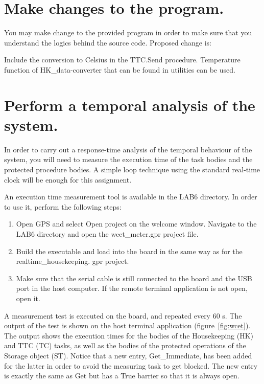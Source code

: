 \section{Make changes to the program.}

You may make change to the provided program in order to make sure
that you understand the logics behind the source code. Proposed change is:

Include the conversion to Celsius in the TTC.Send procedure. Temperature function of HK\_data-converter that can be found in utilities can be used.

\section{Perform a temporal analysis of the system.}\label{sc:ta}

In order to carry out a response-time analysis of the temporal behaviour of the system, you will need to measure the execution time of the task bodies and the protected procedure bodies. A simple loop technique using the standard real-time clock will be enough for this assignment.

An execution time measurement tool is available in the LAB6 directory. In order to use it, perform the following steps:
\begin{enumerate}
\item Open GPS and select Open project on the welcome window. Navigate to the LAB6 directory
and open the wcet\_meter.gpr project file.
\item Build the executable and load into the board in the same way as for the realtime\_housekeeping.
gpr project.
\item Make sure that the serial cable is still connected to the board and the USB port in the host
computer. If the remote terminal application is not open, open it.
\end{enumerate}

A measurement test is executed on the board, and repeated every 60 s. The output of the test is shown on the host terminal application (figure~\ref{fig:wcet}). The output shows the execution times for the bodies of the Housekeeping (HK) and TTC (TC) tasks, as well as the bodies of the protected operations of the Storage object (ST). Notice that a new entry, Get\_Immediate, has been added for the latter in order to avoid the measuring task to get blocked. The new entry is exactly the same as Get but has a True barrier so that it is always open.

